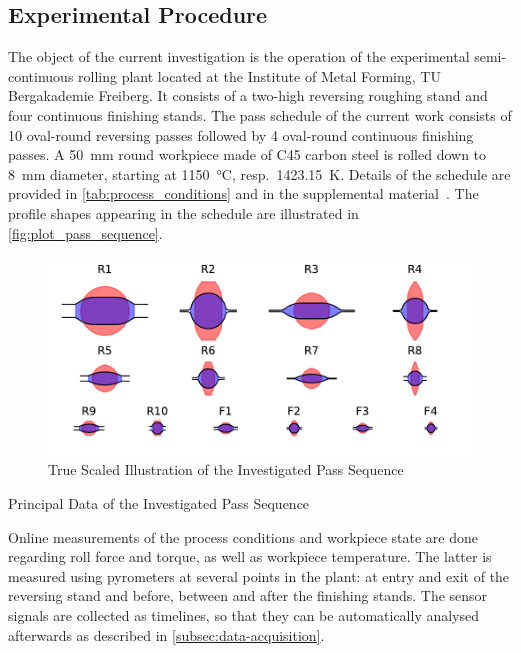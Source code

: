 \subsection{Experimental Procedure}\label{subsec:experimental-procedure}

The object of the current investigation is the operation of the experimental semi-continuous rolling plant located at the Institute of Metal Forming, TU Bergakademie Freiberg.
It consists of a two-high reversing roughing stand and four continuous finishing stands.
The pass schedule of the current work consists of 10 oval-round reversing passes followed by 4 oval-round continuous finishing passes.
A \qty{50}{\milli\meter} round workpiece made of C45 carbon steel is rolled down to \qty{8}{\milli\meter} diameter, starting at \qty{1150}{\celsius}, resp.\ \qty{1423.15}{\kelvin}.
Details of the schedule are provided in \autoref{tab:process_conditions} and in the supplemental material~\cite{WeinerVariationSupplemental2023}.
The profile shapes appearing in the schedule are illustrated in \autoref{fig:plot_pass_sequence}.

\begin{figure}
    \centering
    \includegraphics{img/plot_pass_sequence}
    \caption{True Scaled Illustration of the Investigated Pass Sequence}
    \label{fig:plot_pass_sequence}
\end{figure}


\begin{table}
    \centering
    \caption{Principal Data of the Investigated Pass Sequence}
    \label{tab:process_conditions}
    
\end{table}

Online measurements of the process conditions and workpiece state are done regarding roll force and torque, as well as workpiece temperature.
The latter is measured using pyrometers at several points in the plant: at entry and exit of the reversing stand and before, between and after the finishing stands.
The sensor signals are collected as timelines, so that they can be automatically analysed afterwards as described in \autoref{subsec:data-acquisition}.

